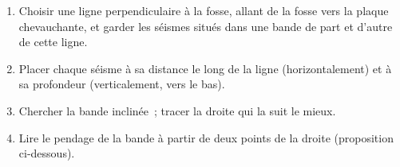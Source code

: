 \begin{method}\label{met:g11:subduction-zones:section}
\begin{enumerate}
  \item Choisir une ligne perpendiculaire à la fosse, allant de la fosse
        vers la plaque chevauchante, et garder les séismes situés dans une
        bande de part et d'autre de cette ligne.
  \item Placer chaque séisme à sa distance le long de la ligne
        (horizontalement) et à sa profondeur (verticalement, vers le bas).
  \item Chercher la bande inclinée~; tracer la droite qui la suit le mieux.
  \item Lire le pendage de la bande à partir de deux points de la droite
        (proposition ci-dessous).
\end{enumerate}
\end{method}

